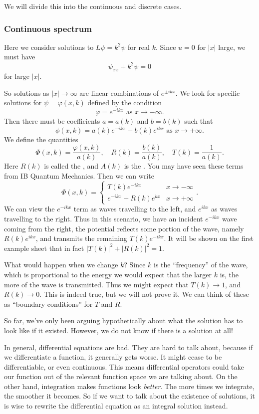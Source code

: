 \documentclass[a4paper]{article}
\begin{document}
We will divide this into the continuous and discrete cases.
\subsubsection{Continuous spectrum}\label{sssec:continuous-spectrum}
Here we consider solutions to $L\psi = k^2 \psi$ for real $k$. Since $u = 0$ for $|x|$ large, we must have
\[
  \psi_{xx} + k^2 \psi = 0
\]
for large $|x|$.

So solutions as $|x| \to \infty$ are linear combinations of $e^{\pm i k x}$. We look for specific solutions for $\psi = \varphi(x, k)$ defined by the condition
\[
  \varphi = e^{-ikx}\text{ as } x \to -\infty.
\]
Then there must be coefficients $a = a(k)$ and $b = b(k)$ such that
\[
  \phi(x, k) = a(k) e^{-ikx} + b(k) e^{ikx}\text{ as }x \to +\infty.
\]
We define the quantities
\[
  \Phi(x, k) = \frac{\varphi(x, k)}{a(k)},\quad R(k) = \frac{b(k)}{a(k)},\quad T(k) = \frac{1}{a(k)}.
\]
Here $R(k)$ is called the , and $A(k)$ is the . You may have seen these terms from IB Quantum Mechanics. Then we can write
\[
  \Phi(x, k) =
  \begin{cases}
    T(k) e^{-ikx} & x \to -\infty\\
    e^{-ikx} + R(k) e^{kx} & x \to +\infty
  \end{cases}.
\]
We can view the $e^{-ikx}$ term as waves travelling to the left, and $e^{ikx}$ as waves travelling to the right. Thus in this scenario, we have an incident $e^{-ikx}$ wave coming from the right, the potential reflects some portion of the wave, namely $R(k) e^{ikx}$, and transmits the remaining $T(k) e^{-ikx}$. It will be shown on the first example sheet that in fact $|T(k)|^2 + |R(k)|^2 = 1$.

What would happen when we change $k$? Since $k$ is the ``frequency'' of the wave, which is proportional to the energy we would expect that the larger $k$ is, the more of the wave is transmitted. Thus we might expect that $T(k) \to 1$, and $R(k) \to 0$. This is indeed true, but we will not prove it. We can think of these as ``boundary conditions'' for $T$ and $R$.

So far, we've only been arguing hypothetically about what the solution has to look like if it existed. However, we do not know if there is a solution at all!

In general, differential equations are bad. They are hard to talk about, because if we differentiate a function, it generally gets worse. It might cease to be differentiable, or even continuous. This means differential operators could take our function out of the relevant function space we are talking about. On the other hand, integration makes functions look \emph{better}. The more times we integrate, the smoother it becomes. So if we want to talk about the existence of solutions, it is wise to rewrite the differential equation as an integral solution instead.
\end{document}
